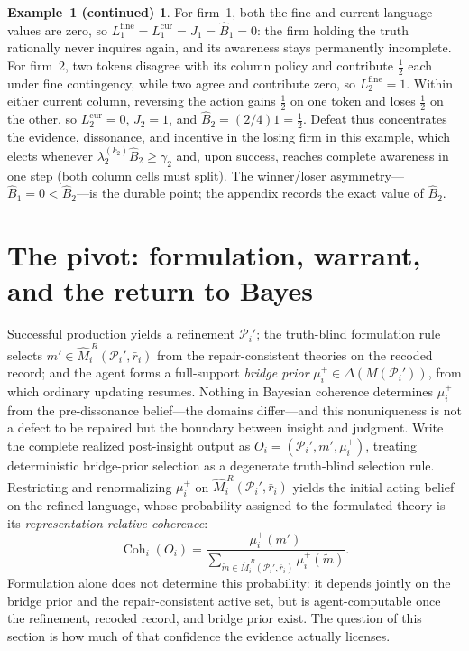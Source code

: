 \documentclass[11pt]{article}
\theoremstyle{definition}
\newtheorem*{excont}{Example~1 (continued)}
\begin{document}
\begin{excont}
For firm~1, both the fine and current-language values are zero, so $L_1^{\mathrm{fine}}=L_1^{\mathrm{cur}}=J_1=\widehat B_1=0$: the firm holding the truth rationally never inquires again, and its awareness stays permanently incomplete.
For firm~2, two tokens disagree with its column policy and contribute $\tfrac12$ each under fine contingency, while two agree and contribute zero, so $L_2^{\mathrm{fine}}=1$.
Within either current column, reversing the action gains $\tfrac12$ on one token and loses $\tfrac12$ on the other, so $L_2^{\mathrm{cur}}=0$, $J_2=1$, and $\widehat B_2=(2/4)1=\tfrac12$.
Defeat thus concentrates the evidence, dissonance, and incentive in the losing firm in this example, which elects whenever $\lambda_2^{(k_2)}\widehat B_2\geq\gamma_2$ and, upon success, reaches complete awareness in one step (both column cells must split).
The winner/loser asymmetry---$\widehat B_1=0<\widehat B_2$---is the durable point; the appendix records the exact value of $\widehat B_2$.
\end{excont}
\section{The pivot: formulation, warrant, and the return to Bayes}
\label{sec:pivot}

Successful production yields a refinement $\mathcal P_i'$; the truth-blind formulation rule selects $m'\in\widehat M_i^{\,R}(\mathcal P_i',\bar r_i)$ from the repair-consistent theories on the recoded record; and the agent forms a full-support \emph{bridge prior} $\mu_i^{+}\in\Delta(M(\mathcal P_i'))$, from which ordinary updating resumes.
Nothing in Bayesian coherence determines $\mu_i^{+}$ from the pre-dissonance belief---the domains differ---and this nonuniqueness is not a defect to be repaired but the boundary between insight and judgment.
Write the complete realized post-insight output as $O_i=(\mathcal P_i',m',\mu_i^+)$, treating deterministic bridge-prior selection as a degenerate truth-blind selection rule.
Restricting and renormalizing $\mu_i^{+}$ on $\widehat M_i^{\,R}(\mathcal P_i',\bar r_i)$ yields the initial acting belief on the refined language, whose probability assigned to the formulated theory is its \emph{representation-relative coherence}:
\begin{equation}
\operatorname{Coh}_i(O_i)
=
\frac{\mu_i^+(m')}
{\displaystyle\sum_{\widetilde m\in\widehat M_i^{\,R}(\mathcal P_i',\bar r_i)}\mu_i^+(\widetilde m)}.
\end{equation}
Formulation alone does not determine this probability: it depends jointly on the bridge prior and the repair-consistent active set, but is agent-computable once the refinement, recoded record, and bridge prior exist.
The question of this section is how much of that confidence the evidence actually licenses.
\end{document}
